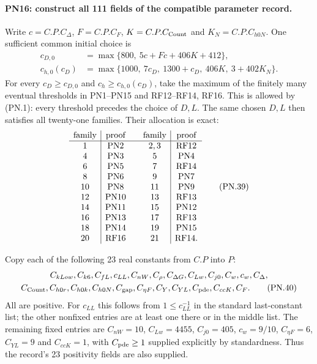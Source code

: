 \documentclass[11pt,a4paper]{article}
\numberwithin{equation}{section}
\theoremstyle{remark}\newtheorem{remark}[theorem]{Remark}
\begin{document}
\paragraph{PN16: construct all 111 fields of the compatible parameter record.}
Write $c=C.P.C_\Delta$, $F=C.P.C_F$, $K=C.P.C_{\rm Count}$ and
$K_N=C.P.C_{h0N}$. One sufficient common initial choice is
\begin{align*}
 c_{D,0}&=\max\{800,\ 5c+Fc+406K+412\},\\
 c_{h,0}(c_D)&=\max\{1000,\ 7c_D,\ 1300+c_D,\
                                 406K,\ 3+402K_N\}.
                                                               \tag{PN.38}
\end{align*}
For every $c_D\geq c_{D,0}$ and $c_h\geq c_{h,0}(c_D)$, take the
maximum of the finitely many eventual thresholds in PN1--PN15 and
RF12--RF14, RF16. This is allowed by (PN.1): every threshold precedes
the choice of $D,L$. The same chosen $D,L$ then satisfies all twenty-one
families. Their allocation is exact:
\[
\begin{array}{c|c@{\qquad}c|c}
 \text{family}&\text{proof}&\text{family}&\text{proof}\\ \hline
 1&\mathrm{PN2}&2,3&\mathrm{RF12}\\
 4&\mathrm{PN3}&5&\mathrm{PN4}\\
 6&\mathrm{PN5}&7&\mathrm{RF14}\\
 8&\mathrm{PN6}&9&\mathrm{PN7}\\
 10&\mathrm{PN8}&11&\mathrm{PN9}\\
 12&\mathrm{PN10}&13&\mathrm{RF13}\\
 14&\mathrm{PN11}&15&\mathrm{PN12}\\
 16&\mathrm{PN13}&17&\mathrm{RF13}\\
 18&\mathrm{PN14}&19&\mathrm{PN15}\\
 20&\mathrm{RF16}&21&\mathrm{RF14}.
\end{array}                                                   \tag{PN.39}
\]

Copy each of the following 23 real constants from $C.P$ into $P$:
\begin{gather*}
 C_{kLow},C_{k6},C_{fL},c_{LL},C_{nW},C_\rho,C_{\Delta G},
 C_{Lw},C_{j0},C_w,c_w,C_\Delta,\\
 C_{\rm Count},C_{h0r},C_{h0k},C_{h0N},C_{\rm gap},C_{\eta F},
 C_Y,C_{YL},C_{\rm pde},C_{ccK},C_F.
                                                               \tag{PN.40}
\end{gather*}
All are positive. For $c_{LL}$ this follows from
$1\leq c_{LL}^{-1}$ in the standard last-constant list; the other
nonfixed entries are at least one there or in the middle list.
The remaining fixed entries are
$C_{nW}=10$, $C_{Lw}=4455$, $C_{j0}=405$, $c_w=9/10$,
$C_{\eta F}=6$, $C_{YL}=9$ and $C_{ccK}=1$, with
$C_{\rm pde}\geq1$ supplied explicitly by standardness.
Thus the record's 23 positivity fields are also supplied.
\end{document}
